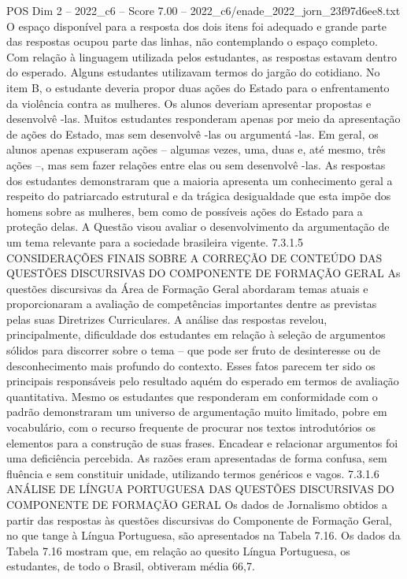 \begin{textsample}{POS Dim 2 – 2022\_c6 – Score 7.00 – 2022\_c6/enade\_2022\_jorn\_23f97d6ee8.txt}
O espaço disponível para a resposta dos dois itens foi adequado e grande parte das respostas ocupou parte das linhas, não contemplando o espaço completo.
Com relação à linguagem utilizada pelos estudantes, as respostas estavam dentro do esperado.
Alguns estudantes utilizavam termos do jargão do cotidiano.
No item B, o estudante deveria propor duas ações do Estado para o enfrentamento da violência contra as mulheres.
Os alunos deveriam apresentar propostas e desenvolvê -las.
Muitos estudantes responderam apenas por meio da apresentação de ações do Estado, mas sem desenvolvê -las ou argumentá -las.
Em geral, os alunos apenas expuseram ações – algumas vezes, uma, duas e, até mesmo, três ações –, mas sem fazer relações entre elas ou sem desenvolvê -las.
As respostas dos estudantes demonstraram que a maioria apresenta um conhecimento geral a respeito do patriarcado estrutural e da trágica desigualdade que esta impõe dos homens sobre as mulheres, bem como de possíveis ações do Estado para a proteção delas.
A Questão visou avaliar o desenvolvimento da argumentação de um tema relevante para a sociedade brasileira vigente. 7.3.1.5 CONSIDERAÇÕES FINAIS SOBRE A CORREÇÃO DE CONTEÚDO DAS QUESTÕES DISCURSIVAS DO COMPONENTE DE FORMAÇÃO GERAL As questões discursivas da Área de Formação Geral abordaram temas atuais e proporcionaram a avaliação de competências importantes dentre as previstas pelas suas Diretrizes Curriculares.
A análise das respostas revelou, principalmente, dificuldade dos estudantes em relação à seleção de argumentos sólidos para discorrer sobre o tema – que pode ser fruto de desinteresse ou de desconhecimento mais profundo do contexto.
Esses fatos parecem ter sido os principais responsáveis pelo resultado aquém do esperado em termos de avaliação quantitativa.
Mesmo os estudantes que responderam em conformidade com o padrão demonstraram um universo de argumentação muito limitado, pobre em vocabulário, com o recurso frequente de procurar nos textos introdutórios os elementos para a construção de suas frases.
Encadear e relacionar argumentos foi uma deficiência percebida.
As razões eram apresentadas de forma confusa, sem fluência e sem constituir unidade, utilizando termos genéricos e vagos. 7.3.1.6 ANÁLISE DE LÍNGUA PORTUGUESA DAS QUESTÕES DISCURSIVAS DO COMPONENTE DE FORMAÇÃO GERAL Os dados de Jornalismo obtidos a partir das respostas às questões discursivas do Componente de Formação Geral, no que tange à Língua Portuguesa, são apresentados na Tabela 7.16.
Os dados da Tabela 7.16 mostram que, em relação ao quesito Língua Portuguesa, os estudantes, de todo o Brasil, obtiveram média 66,7.

\end{textsample}
